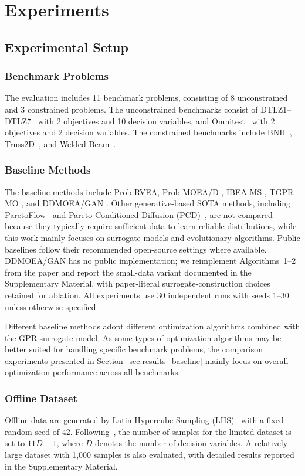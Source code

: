 \documentclass{article}
\begin{document}
\section{Experiments}
\subsection{Experimental Setup}
\subsubsection{Benchmark Problems}
The evaluation includes 11 benchmark problems, consisting of 8 unconstrained and 3 constrained problems. The unconstrained benchmarks consist of DTLZ1–DTLZ7~\cite{opt_dtlz} with 2 objectives and 10 decision variables, and Omnitest~\cite{omnitest} with 2 objectives and 2 decision variables. The constrained benchmarks include BNH~\cite{bnh}, Truss2D~\cite{truss2d}, and Welded Beam~\cite{welded_beam}.

\subsubsection{Baseline Methods} \label{sec:baseline}
The baseline methods include Prob-RVEA, Prob-MOEA/D \cite{ddeo_rvea}, IBEA-MS \cite{ddeo_ibea}, TGPR-MO \cite{ddeo-TGPR}, and DDMOEA/GAN \cite{ddea_gan}. Other generative-based SOTA methods, including ParetoFlow~\cite{paretoflow} and Pareto-Conditioned Diffusion (PCD)~\cite{pcd}, are not compared because they typically require sufficient data to learn reliable distributions, while this work mainly focuses on surrogate models and evolutionary algorithms. Public baselines follow their recommended open-source settings where available. DDMOEA/GAN has no public implementation; we reimplement Algorithms~1--2 from the paper and report the small-data variant documented in the Supplementary Material, with paper-literal surrogate-construction choices retained for ablation. All experiments use 30 independent runs with seeds 1–30 unless otherwise specified.

Different baseline methods adopt different optimization algorithms combined with the GPR surrogate model. As some types of optimization algorithms may be better suited for handling specific benchmark problems, the comparison experiments presented in Section~\ref{sec:results_baseline} mainly focus on overall optimization performance across all benchmarks.

\subsubsection{Offline Dataset} 
Offline data are generated by Latin Hypercube Sampling (LHS)~\cite{sampling} with a fixed random seed of 42. Following~\cite{ddeo_ibea}, the number of samples for the limited dataset is set to $11D - 1$, where $D$ denotes the number of decision variables. A relatively large dataset with 1,000 samples is also evaluated, with detailed results reported in the Supplementary Material.
\end{document}
